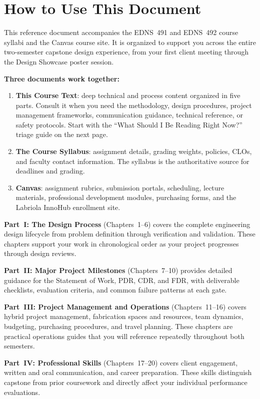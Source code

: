 \chapter*{How to Use This Document}

This reference document accompanies the EDNS~491 and EDNS~492 course syllabi and the Canvas course site. It is organized to support you across the entire two-semester capstone design experience, from your first client meeting through the Design Showcase poster session.

\textbf{Three documents work together:}
\begin{enumerate}[nosep,leftmargin=1.5em]
\item \textbf{This Course Text}: deep technical and process content organized in five parts. Consult it when you need the methodology, design procedures, project management frameworks, communication guidance, technical reference, or safety protocols. Start with the ``What Should I Be Reading Right Now?'' triage guide on the next page.
\item \textbf{The Course Syllabus}: assignment details, grading weights, policies, CLOs, and faculty contact information. The syllabus is the authoritative source for deadlines and grading.
\item \textbf{Canvas}: assignment rubrics, submission portals, scheduling, lecture materials, professional development modules, purchasing forms, and the Labriola InnoHub enrollment site.
\end{enumerate}

\textbf{Part~I: The Design Process} (Chapters~1--6) covers the complete engineering design lifecycle from problem definition through verification and validation. These chapters support your work in chronological order as your project progresses through design reviews.

\textbf{Part~II: Major Project Milestones} (Chapters~7--10) provides detailed guidance for the Statement of Work, PDR, CDR, and FDR, with deliverable checklists, evaluation criteria, and common failure patterns at each gate.

\textbf{Part~III: Project Management and Operations} (Chapters~11--16) covers hybrid project management, fabrication spaces and resources, team dynamics, budgeting, purchasing procedures, and travel planning. These chapters are practical operations guides that you will reference repeatedly throughout both semesters.

\textbf{Part~IV: Professional Skills} (Chapters~17--20) covers client engagement, written and oral communication, and career preparation. These skills distinguish capstone from prior coursework and directly affect your individual performance evaluations.

